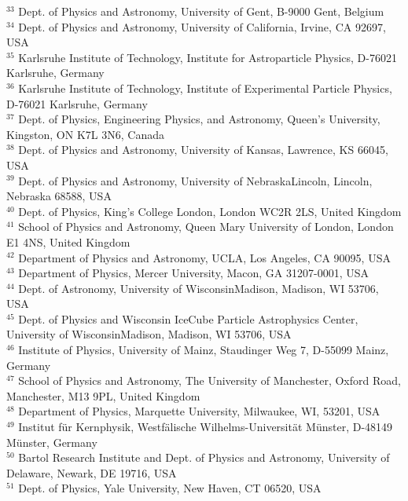 \documentclass[a4paper,11pt]{article}
\begin{document}
$^{33}$ Dept. of Physics and Astronomy, University of Gent, B-9000 Gent, Belgium \\
$^{34}$ Dept. of Physics and Astronomy, University of California, Irvine, CA 92697, USA \\
$^{35}$ Karlsruhe Institute of Technology, Institute for Astroparticle Physics, D-76021 Karlsruhe, Germany  \\
$^{36}$ Karlsruhe Institute of Technology, Institute of Experimental Particle Physics, D-76021 Karlsruhe, Germany  \\
$^{37}$ Dept. of Physics, Engineering Physics, and Astronomy, Queen's University, Kingston, ON K7L 3N6, Canada \\
$^{38}$ Dept. of Physics and Astronomy, University of Kansas, Lawrence, KS 66045, USA \\
$^{39}$ Dept. of Physics and Astronomy, University of Nebraska{\textendash}Lincoln, Lincoln, Nebraska 68588, USA \\
$^{40}$ Dept. of Physics, King's College London, London WC2R 2LS, United Kingdom \\
$^{41}$ School of Physics and Astronomy, Queen Mary University of London, London E1 4NS, United Kingdom \\
$^{42}$ Department of Physics and Astronomy, UCLA, Los Angeles, CA 90095, USA \\
$^{43}$ Department of Physics, Mercer University, Macon, GA 31207-0001, USA \\
$^{44}$ Dept. of Astronomy, University of Wisconsin{\textendash}Madison, Madison, WI 53706, USA \\
$^{45}$ Dept. of Physics and Wisconsin IceCube Particle Astrophysics Center, University of Wisconsin{\textendash}Madison, Madison, WI 53706, USA \\
$^{46}$ Institute of Physics, University of Mainz, Staudinger Weg 7, D-55099 Mainz, Germany \\
$^{47}$ School of Physics and Astronomy, The University of Manchester, Oxford Road, Manchester, M13 9PL, United Kingdom \\
$^{48}$ Department of Physics, Marquette University, Milwaukee, WI, 53201, USA \\
$^{49}$ Institut f{\"u}r Kernphysik, Westf{\"a}lische Wilhelms-Universit{\"a}t M{\"u}nster, D-48149 M{\"u}nster, Germany \\
$^{50}$ Bartol Research Institute and Dept. of Physics and Astronomy, University of Delaware, Newark, DE 19716, USA \\
$^{51}$ Dept. of Physics, Yale University, New Haven, CT 06520, USA \\
\end{document}
